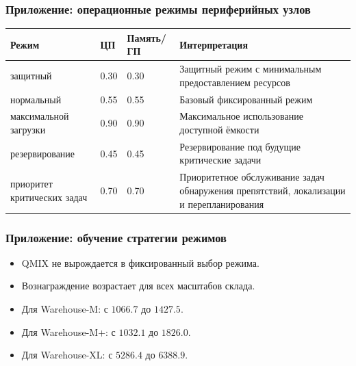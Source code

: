 \begin{frame}
	\frametitle{Приложение: операционные режимы периферийных узлов}
	\setlength{\tabcolsep}{1.5pt}
	\scriptsize
	\begin{tabular}{|p{}|p{}|p{}|p{}|}
		\hline
		\textbf{Режим} & \textbf{ЦП} & \textbf{Память/ГП} & \textbf{Интерпретация} \\
		\hline
		защитный & 0.30 & 0.30 & Защитный режим с минимальным предоставлением ресурсов \\
		\hline
		нормальный & 0.55 & 0.55 & Базовый фиксированный режим \\
		\hline
		максимальной загрузки & 0.90 & 0.90 & Максимальное использование доступной ёмкости \\
		\hline
		резервирование & 0.45 & 0.45 & Резервирование под будущие критические задачи \\
		\hline
		приоритет критических задач & 0.70 & 0.70 & Приоритетное обслуживание задач обнаружения препятствий, локализации и перепланирования \\
		\hline
	\end{tabular}
\end{frame}

\begin{frame}
	\frametitle{Приложение: обучение стратегии режимов}
	\small
	\begin{center}
	\end{center}
	\begin{itemize}
		\item QMIX не вырождается в фиксированный выбор режима.
		\item Вознаграждение возрастает для всех масштабов склада.
		\item Для Warehouse-M: с $1066.7$ до $1427.5$.
		\item Для Warehouse-M+: с $1032.1$ до $1826.0$.
		\item Для Warehouse-XL: с $5286.4$ до $6388.9$.
	\end{itemize}
\end{frame}

